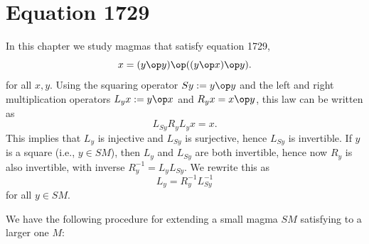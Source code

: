 \chapter{Equation 1729}\label{1729-chapter}

In this chapter we study magmas that satisfy equation 1729,
\begin{equation}\label{1729}
  x = (y \op y) \op ((y \op x) \op y).
\end{equation}
for all $x,y$.  Using the squaring operator $Sy := y \op y$ and the left and right multiplication operators $L_y x := y \op x$ and $R_y x = x \op y$, this law can be written as
$$ L_{Sy} R_y L_{y} x = x.$$
This implies that $L_y$ is injective and $L_{Sy}$ is surjective, hence $L_{Sy}$ is invertible.  If $y$ is a square (i.e., $y \in SM$), then $L_y$ and $L_{Sy}$ are both invertible, hence now $R_y$ is also invertible, with inverse $R_y^{-1} = L_y L_{Sy}$.  We rewrite this as
\begin{equation}\label{lys}
  L_y = R_y^{-1} L_{Sy}^{-1}
\end{equation}
for all $y \in SM$.

We have the following procedure for extending a small magma $SM$ satisfying  to a larger one $M$:

